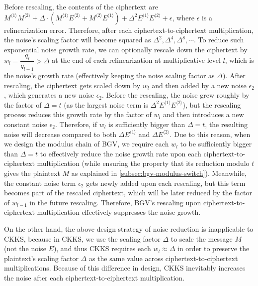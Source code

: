  Before rescaling, the contents of the ciphertext are $M^{\langle 1 \rangle}M^{\langle 2 \rangle} + \Delta\cdot (M^{\langle 1 \rangle}E^{\langle 2 \rangle} + M^{\langle 2 \rangle}E^{\langle 1 \rangle}) + \Delta^2E^{\langle 1 \rangle}E^{\langle 2 \rangle} + \epsilon$, where $\epsilon$ is a relinearization error. Therefore, after each ciphertext-to-ciphertext multiplication, the noise's scaling factor will become squared as $\Delta^2, \Delta^4, \Delta^8, \cdots$. To reduce such exponential noise growth rate, we can optionally rescale down the ciphertext by $w_l = \dfrac{q_l}{q_{l-1}} > \Delta$ at the end of each relinearization at multiplicative level $l$, which is the noise's growth rate (effectively keeping the noise scaling factor as $\Delta$). After rescaling, the ciphertext gets scaled down by $w_l$ and then added by a new noise $\epsilon_2$, which generates a new noise $\epsilon_2$. Before the rescaling, the noise grew roughly by the factor of $\Delta = t$ (as the largest noise term is $\Delta^2 E^{\langle 1 \rangle} E^{\langle 2 \rangle}$), but the rescaling process reduces this growth rate by the factor of $w_l$ and then introduces a new constant noise $\epsilon_2$. Therefore, if $w_l$ is sufficiently bigger than $\Delta = t$, the resulting noise will decrease compared to both $\Delta E^{\langle 1 \rangle}$ and $\Delta E^{\langle 2 \rangle}$. Due to this reason, when we design the modulus chain of BGV, we require each $w_l$ to be sufficiently bigger than $\Delta = t$ to effectively reduce the noise growth rate upon each ciphertext-to-ciphertext multiplication (while ensuring the property that its reduction modulo $t$ gives the plaintext $M$ as explained in \autoref{subsec:bgv-modulus-switch}). Meanwhile, the constant noise term $\epsilon_2$ gets newly added upon each rescaling, but this term becomes part of the rescaled ciphertext, which will be later reduced by the factor of $w_{l-1}$ in the future rescaling. Therefore, BGV's rescaling upon ciphertext-to-ciphertext multiplication effectively suppresses the noise growth. 

On the other hand, the above design strategy of noise reduction is inapplicable to CKKS, because in CKKS, we use the scaling factor $\Delta$ to scale the message $M$ (not the noise $E$), and thus CKKS requires each $w_l \approx \Delta$ in order to preserve the plaintext's scaling factor $\Delta$ as the same value across ciphertext-to-ciphertext multiplications. Because of this difference in design, CKKS inevitably increases the noise after each ciphertext-to-ciphertext multiplication. 


